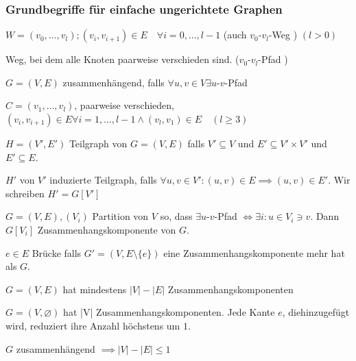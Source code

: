 \subsubsection{Grundbegriffe für einfache ungerichtete Graphen}
\begin{def*}[note = Weg , index = Weg]
$W = ( v_0 , \dotsc , v_l ) ; (v_i,v_{i+1}) \in E \quad \forall i = 0 , \dotsc , l-1$ (auch $v_0$-$v_l$-Weg ) $(l > 0)$
\end{def*}
\begin{def*}[note = Pfad , index = Pfad]
Weg, bei dem alle Knoten paarweise verschieden sind. ($v_0$-$v_l$-Pfad )
\end{def*}
\begin{def*}[note = zusammenhängend , index = Graph!zusammenhängend]
	$G=(V,E)$ zusammenhängend, falls $\forall u , v \in V \exists u$-$v$-Pfad
\end{def*}
\begin{def*}[note = Kreis , index = Kreis]
	$C=(v_1 , \dotsc , v_l)$, paarweise verschieden, $(v_i,v_{i+1}) \in E \forall i = 1 , \dotsc , l-1 \wedge (v_l , v_1) \in E \quad (l \geq 3 )$
\end{def*}
\begin{def*}[note = Teilgraph , index = Teilgraph]
	$H=(V',E')$ Teilgraph von $G=(V,E)$ falls $V' \subseteq V$ und $E' \subseteq V' \times V'$ und $E' \subseteq E$.
\end{def*}
\begin{def*}[note = induzierter Teilgraph , index = Teilgraph!induzierter]
	$H'$ von $V'$ induzierte Teilgraph, falls $\forall u , v \in V' : (u,v) \in E \implies (u,v) \in E'$. Wir schreiben $H'=G[V']$
\end{def*}
\begin{def*}[note = Zusammenhangskomponente , index = Zusammenhangskomponente]
	$G=(V,E) , (V_i)$ Partition von $V$ so, dass $\exists u$-$v$-Pfad $\iff \exists i : u \in V_i \ni v$. Dann $G[V_i]$ Zusammenhangskomponente von $G$.
\end{def*}
\begin{def*}[note = Brücke , index = Brücke]
	$e \in E$ Brücke falls $G'=(V,E \setminus \{e\})$ eine Zusammenhangskomponente mehr hat als $G$.
\end{def*}
\begin{satz*}
	$G=(V,E)$ hat mindestens $|V|-|E|$ Zusammenhangskomponenten
	\begin{bew}
		$G=(V,\varnothing)$ hat |V| Zusammenhangskomponenten. Jede Kante $e$, diehinzugefügt wird, reduziert ihre Anzahl höchstens um $1$.
	\end{bew}
	\begin{korr*}
		$G$ zusammenhängend $\implies |V| - |E| \leq 1$
	\end{korr*}
\end{satz*}